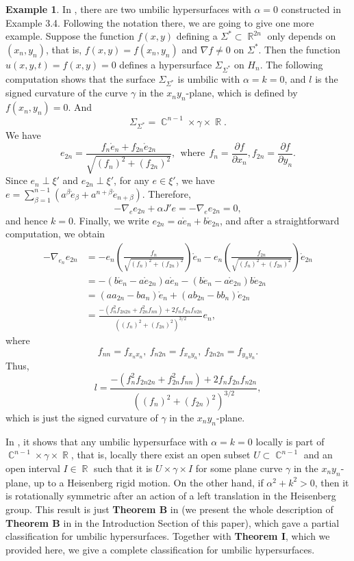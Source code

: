 \documentclass[12pt]{amsart}
\theoremstyle{definition}\newtheorem{exa}[thm]{\sc Example}
\theoremstyle{definition}\newtheorem{de}[thm]{\sc Definition}
\theoremstyle{definition}\newtheorem{rem}[thm]{\sc Remark}
\theoremstyle{definition}\newtheorem{prob}[thm]{\it Problem}
\theoremstyle{definition}\newtheorem{fact}[thm]{\sc Fact}
\theoremstyle{definition}\newtheorem{claim}[thm]{\sc Claim}
\numberwithin{equation}{section}
\DeclareMathOperator{\R}{\mathbb R}
\DeclareMathOperator{\C}{\mathbb C}
\begin{document}
\begin{exa} In \cite{CCHY1}, there are two umbilic hypersurfaces with $\alpha=0$ constructed in Example 3.4. Following the notation there, we are going to give one more example. Suppose the function $f(x,y)$ defining a $\Sigma^{*}\subset\R^{2n}$ only depends on $(x_{n},y_{n})$, that is, $f(x,y)=f(x_{n},y_{n})$ and $\nabla f\neq 0 $ on $\Sigma^{*}$. Then the function $u(x,y,t)=f(x,y)=0$ defines a hypersurface $\Sigma_{\Sigma^{*}}$ on $H_{n}$. The following computation shows that the surface $\Sigma_{\Sigma^{*}}$ is umbilic with $\alpha=k=0$, and $l$ is the signed curvature of the curve $\gamma$ in the $x_{n}y_{n}$-plane, which is defined by $f(x_{n},y_{n})=0$. And
\[\Sigma_{\Sigma^{*}}=\C^{n-1}\times\gamma\times\R.\]
We have
\[e_{2n}=\frac{f_{n}\mathring{e}_{n}+f_{2n}\mathring{e}_{2n}}{\sqrt{(f_{n})^{2}+(f_{2n})^{2}}},\ \ \textrm{where}\ \ f_{n}=\frac{\partial f}{\partial x_{n}}, f_{2n}=\frac{\partial f}{\partial y_{n}}.\]
Since $e_{n}\perp\xi'$ and $e_{2n}\perp\xi'$, for any $e\in\xi'$, we have $e=\sum_{\beta=1}^{n-1}(a^{\beta}\mathring{e}_{\beta}+a^{n+\beta}\mathring{e}_{n+\beta})$. Therefore, 
\[-\nabla_{e}e_{2n}+\alpha J'e=-\nabla_{e}e_{2n}=0,\]
and hence $k=0$. Finally, we write $e_{2n}=a\mathring{e}_{n}+b\mathring{e}_{2n}$, and after a straightforward computation, we obtain
\[\begin{split}
-\nabla_{e_{n}}e_{2n}&=-e_{n}\left(\frac{f_{n}}{\sqrt{(f_{n})^{2}+(f_{2n})^{2}}}\right)\mathring{e}_{n}-e_{n}\left(\frac{f_{2n}}{\sqrt{(f_{n})^{2}+(f_{2{}n})^{2}}}\right)\mathring{e}_{2n}\\
&=-(b\mathring{e}_{n}-a\mathring{e}_{2n})a\mathring{e}_{n}-(b\mathring{e}_{n}-a\mathring{e}_{2n})b\mathring{e}_{2n}\\
&=(aa_{2n}-ba_{n})\mathring{e}_{n}+(ab_{2n}-bb_{n})\mathring{e}_{2n}\\
&=\frac{-(f_{n}^{2}f_{2n 2n}+f_{2n}^{2}f_{nn})+2f_{n}f_{2n}f_{n 2n}}{((f_{n})^{2}+(f_{2n})^{2})^{3/2}}e_{n},
\end{split}\]
where
\[f_{nn}=f_{x_{n}x_{n}},\ f_{n2n}=f_{x_{n}y_{n}},\ f_{2n2n}=f_{y_{n}y_{n}}.\]
Thus, 
\[l=\frac{-(f_{n}^{2}f_{2n 2n}+f_{2n}^{2}f_{nn})+2f_{n}f_{2n}f_{n 2n}}{((f_{n})^{2}+(f_{2n})^{2})^{3/2}},\]
which is just the signed curvature of $\gamma$ in the $x_{n}y_{n}$-plane.
\end{exa}

In \cite{CCHY2}, it shows that any umbilic hypersurface with $\alpha=k=0$ locally is part of $\C^{n-1}\times\gamma\times\R$, that is, locally there exist an open subset $U\subset\C^{n-1}$ and an open interval $I\in\R$ such that it is $U\times\gamma\times I$ for some plane curve $\gamma$ in the $x_{n}y_{n}$-plane, up to a Heisenberg rigid motion. On the other hand, if $\alpha^{2}+k^{2}>0$, then it is rotationally symmetric after an action of a left translation in the Heisenberg group. This result is just {\bf Theorem B} in \cite{CCHY2} (we present the whole description of {\bf Theorem B} in \cite{CCHY2} in the Introduction Section of this paper), which gave a partial classification for umbilic hypersurfaces.  Together with {\bf Theorem I}, which we provided here, we give a complete classification for umbilic hypersurfaces.
\end{document}
